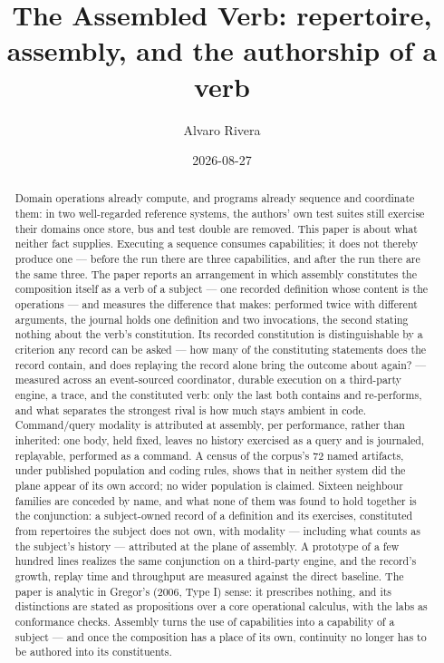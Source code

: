 \documentclass[
]{article}
\title{The Assembled Verb: repertoire, assembly, and the authorship of a
verb}
\author{Alvaro Rivera}
\date{2026-08-27}
\newcounter{none} %
\begin{document}
\maketitle
\begin{abstract}
Domain operations already compute, and programs already sequence and
coordinate them: in two well-regarded reference systems, the authors'
own test suites still exercise their domains once store, bus and test
double are removed. This paper is about what neither fact supplies.
Executing a sequence consumes capabilities; it does not thereby produce
one --- before the run there are three capabilities, and after the run
there are the same three. The paper reports an arrangement in which
assembly constitutes the composition itself as a verb of a subject ---
one recorded definition whose content is the operations --- and measures
the difference that makes: performed twice with different arguments, the
journal holds one definition and two invocations, the second stating
nothing about the verb's constitution. Its recorded constitution is
distinguishable by a criterion any record can be asked --- how many of
the constituting statements does the record contain, and does replaying
the record alone bring the outcome about again? --- measured across an
event-sourced coordinator, durable execution on a third-party engine, a
trace, and the constituted verb: only the last both contains and
re-performs, and what separates the strongest rival is how much stays
ambient in code. Command/query modality is attributed at assembly, per
performance, rather than inherited: one body, held fixed, leaves no
history exercised as a query and is journaled, replayable, performed as
a command. A census of the corpus's 72 named artifacts, under published
population and coding rules, shows that in neither system did the plane
appear of its own accord; no wider population is claimed. Sixteen
neighbour families are conceded by name, and what none of them was found
to hold together is the conjunction: a subject-owned record of a
definition and its exercises, constituted from repertoires the subject
does not own, with modality --- including what counts as the subject's
history --- attributed at the plane of assembly. A prototype of a few
hundred lines realizes the same conjunction on a third-party engine, and
the record's growth, replay time and throughput are measured against the
direct baseline. The paper is analytic in Gregor's (2006, Type I) sense:
it prescribes nothing, and its distinctions are stated as propositions
over a core operational calculus, with the labs as conformance checks.
Assembly turns the use of capabilities into a capability of a subject
--- and once the composition has a place of its own, continuity no
longer has to be authored into its constituents.
\end{abstract}
\end{document}
